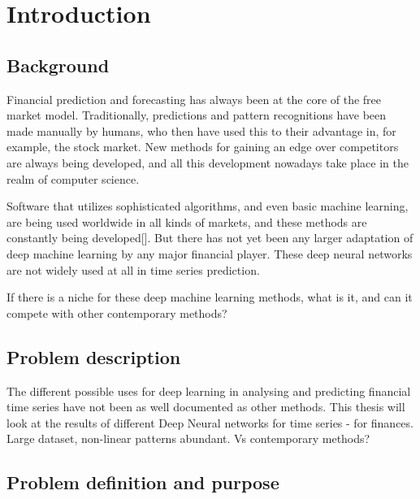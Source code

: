\section{Introduction}

\subsection{Background}

Financial prediction and forecasting has always been at the core of the free market model. Traditionally, predictions and pattern recognitions have been made manually by humans, who then have used this to their advantage in, for example, the stock market. New methods for gaining an edge over competitors are always being developed, and all this development nowadays take place in the realm of computer science.

Software that utilizes sophisticated algorithms, and even basic machine learning, are being used worldwide in all kinds of markets, and these methods are constantly being developed[]. But there has not yet been any larger adaptation of deep machine learning by any major financial player. These deep neural networks are not widely used at all in time series prediction.

If there is a niche for these deep machine learning methods, what is it, and can it compete with other contemporary methods?


\subsection{Problem description}


The different possible uses for deep learning in analysing and predicting financial time series have not been as well documented as other methods. This thesis will look at the results of different 
Deep Neural networks for time series - for finances.
Large dataset, non-linear patterns abundant.
Vs contemporary methods?


\subsection{Problem definition and purpose}

